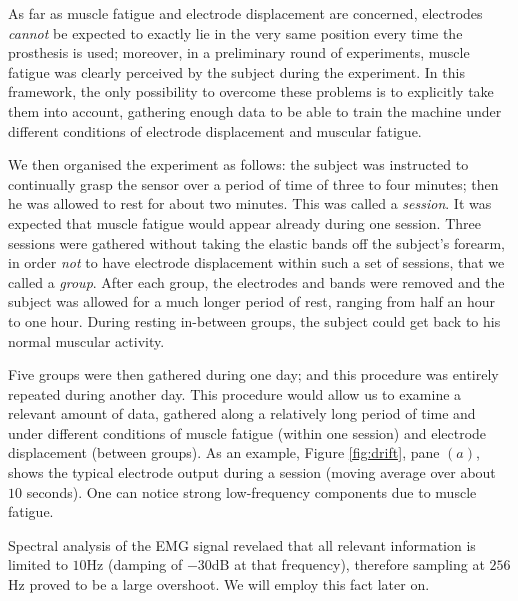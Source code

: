 As far as muscle fatigue and electrode displacement are concerned,
electrodes \emph{cannot} be expected to exactly lie in the very same
position every time the prosthesis is used; moreover, in a preliminary
round of experiments, muscle fatigue was clearly perceived by the
subject during the experiment. In this framework, the only possibility
to overcome these problems is to explicitly take them into account,
gathering enough data to be able to train the machine under different
conditions of electrode displacement and muscular fatigue.

We then organised the experiment as follows: the subject was
instructed to continually grasp the sensor over a period of time of
three to four minutes; then he was allowed to rest for about two
minutes. This was called a \emph{session}. It was expected that muscle
fatigue would appear already during one session. Three sessions were
gathered without taking the elastic bands off the subject's forearm,
in order \emph{not} to have electrode displacement within such a set
of sessions, that we called a \emph{group}. After each group, the
electrodes and bands were removed and the subject was allowed for a
much longer period of rest, ranging from half an hour to one
hour. During resting in-between groups, the subject could get back to
his normal muscular activity.

Five groups were then gathered during one day; and this procedure was
entirely repeated during another day. This procedure would allow us to
examine a relevant amount of data, gathered along a relatively long
period of time and under different conditions of muscle fatigue
(within one session) and electrode displacement (between groups). As
an example, Figure \ref{fig:drift}, pane $(a)$, shows the typical
electrode output during a session (moving average over about $10$
seconds). One can notice strong low-frequency components due to muscle
fatigue.

Spectral analysis of the EMG signal revelaed that all relevant
information is limited to $10$Hz (damping of $-30$dB at that
frequency), therefore sampling at $256$Hz proved to be a large
overshoot. We will employ this fact later on.

